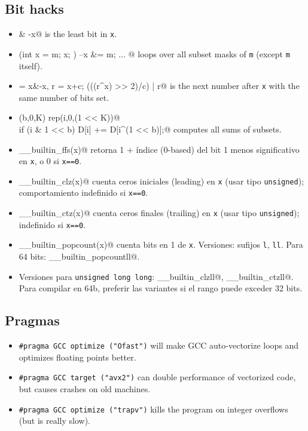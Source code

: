     \subsection{Bit hacks}
        \begin{itemize}
            \item \verb@x & -x@ is the least bit in \texttt{x}.
            \item \verb@for (int x = m; x; ) { --x &= m; ... }@ loops over all subset masks of \texttt{m} (except \texttt{m} itself).
            \item \verb@c = x&-x, r = x+c; (((r^x) >> 2)/c) | r@ is the next number after \texttt{x} with the same number of bits set.
            \item \verb@rep(b,0,K) rep(i,0,(1 << K))@ \\ \verb@  if (i & 1 << b) D[i] += D[i^(1 << b)];@ computes all sums of subsets.
            \item \verb@__builtin_ffs(x)@ retorna 1 + índice (0-based) del bit 1 menos significativo en \texttt{x}, o 0 si \texttt{x==0}.
            \item \verb@__builtin_clz(x)@ cuenta ceros iniciales (leading) en \texttt{x} (usar tipo \texttt{unsigned}); comportamiento indefinido si \texttt{x==0}.
            \item \verb@__builtin_ctz(x)@ cuenta ceros finales (trailing) en \texttt{x} (usar tipo \texttt{unsigned}); indefinido si \texttt{x==0}.
            \item \verb@__builtin_popcount(x)@ cuenta bits en 1 de \texttt{x}. Versiones: sufijos \texttt{l}, \texttt{ll}. Para 64 bits: \verb@__builtin_popcountll@.
            \item Versiones para \texttt{unsigned long long}: \verb@__builtin_clzll@, \verb@__builtin_ctzll@. Para compilar en 64b, preferir las variantes \verb@ll@ si el rango puede exceder 32 bits.
        \end{itemize}
    \subsection{Pragmas}
        \begin{itemize}
            \item \lstinline{#pragma GCC optimize ("Ofast")} will make GCC auto-vectorize loops and optimizes floating points better.
            \item \lstinline{#pragma GCC target ("avx2")} can double performance of vectorized code, but causes crashes on old machines.
            \item \lstinline{#pragma GCC optimize ("trapv")} kills the program on integer overflows (but is really slow).
        \end{itemize}
